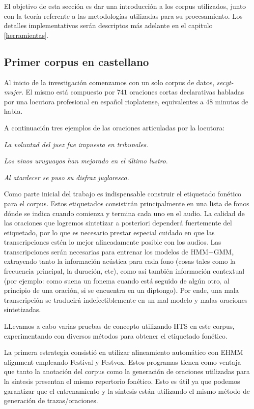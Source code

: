 El objetivo de esta sección es dar una introducción a los corpus utilizados, junto con la teoría referente a las metodologías utilizadas para su procesamiento. Los detalles implementativos serán descriptos más adelante en el capitulo \ref{herramientas}.

\subsection{Primer corpus en castellano}

Al inicio de la investigación comenzamos con un solo corpus de datos, \textit{secyt-mujer}\cite{secytMujer}. El mismo está compuesto por $741$ oraciones cortas declarativas habladas por una locutora profesional en español rioplatense, equivalentes a $48$ minutos de habla.

A continuación tres ejemplos de las oraciones articuladas por la locutora:

\indent\indent \textit{La voluntad del juez fue impuesta en tribunales.}

\indent\indent \textit{Los vinos uruguayos han mejorado en el último lustro.}

\indent\indent \textit{Al atardecer se puso su disfraz juglaresco.}

Como parte inicial del trabajo es indispensable construir el etiquetado fonético para el corpus. Estos etiquetados consistirán principalmente en una lista de fonos dónde se indica cuando comienza y termina cada uno en el audio. La calidad de las oraciones que logremos sintetizar a posteriori dependerá fuertemente del etiquetado, por lo que es necesario prestar especial cuidado en que las transcripciones estén lo mejor alineadamente posible con los audios. Las transcripciones serán necesarias para entrenar los modelos de HMM+GMM, extrayendo tanto la información acústica para cada fono (cosas tales como la frecuencia principal, la duración, etc), como así también información contextual (por ejemplo: como suena un fonema cuando está seguido de algún otro, al principio de una oración, si se encuentra en un diptongo). Por ende, una mala transcripción se traducirá indefectiblemente en un mal modelo y malas oraciones sintetizadas.

LLevamos a cabo varias pruebas de concepto utilizando HTS en este corpus, experimentando con diversos métodos para obtener el etiquetado fonético. 

La primera estrategia consistió en utilizar alineamiento automático con EHMM alignment \cite{phoneticCapturing} empleando Festival y Festvox. Estos programas tienen como ventaja que tanto la anotación del corpus como la generación de oraciones utilizadas para la síntesis presentan el mismo repertorio fonético. Esto es útil ya que podemos garantizar que el entrenamiento y la síntesis están utilizando el mismo método de generación de trazas/oraciones.

